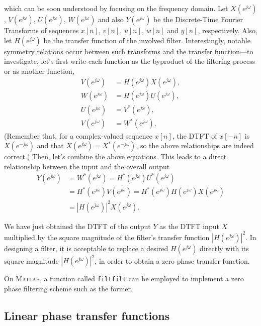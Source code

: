 \documentclass[\documentfontsize, twocolumn]{\classname}
\begin{document}
which can be soon understood by focusing on the frequency domain. Let $X(e^{j\omega})$, $V(e^{j\omega})$, $U(e^{j\omega})$, $W(e^{j\omega})$ and also $Y(e^{j\omega})$ be the Discrete-Time Fourier Transforms of sequences $x[n]$, $v[n]$, $u[n]$, $w[n]$ and $y[n]$, respectively. Also, let $H(e^{j\omega})$ be the transfer function of the involved filter. Interestingly, notable symmetry relations occur between such transforms and the transfer function---to investigate, let's first write each function as the byproduct of the filtering process or as another function,
\begin{align*}
    V(e^{j\omega}) &= H(e^{j\omega})X(e^{j\omega}),\\
    W(e^{j\omega}) &= H(e^{j\omega})U(e^{j\omega}),\\
    U(e^{j\omega}) &= V^*(e^{j\omega}),\\
    V(e^{j\omega}) &= W^*(e^{j\omega}).
\end{align*}
(Remember that, for a complex-valued sequence $x[n]$, the DTFT of $x[-n]$ is $X(e^{-j\omega})$ and that $X(e^{j\omega}) = X^*(e^{-j\omega})$, so the above relationships are indeed correct.) Then, let's combine the above equations. This leads to a direct relationship between the input and the overall output
\begin{align*}
    Y(e^{j\omega}) &= W^*(e^{j\omega}) = H^*(e^{j\omega})U^*(e^{j\omega})\\
                   &= H^*(e^{j\omega})V(e^{j\omega}) = H^*(e^{j\omega})H(e^{j\omega})X(e^{j\omega})\\
                   &= \left|H(e^{j\omega})\right|^2X(e^{j\omega}).
\end{align*}

We have just obtained the DTFT of the output $Y$ as the DTFT input $X$ multiplied by the square magnitude of the filter's transfer function $\left|H(e^{j\omega})\right|^2$. In designing a filter, it is acceptable to replace a desired $H(e^{j\omega})$ directly with its square magnitude $\left|H(e^{j\omega})\right|^2$, in order to obtain a zero phase transfer function.

On \textsc{Matlab}, a function called \texttt{filtfilt} can be employed to implement a zero phase filtering scheme such as the former.


\subsection{Linear phase transfer functions}\label{sec:linearPhaseTransferFunctions}
\end{document}
